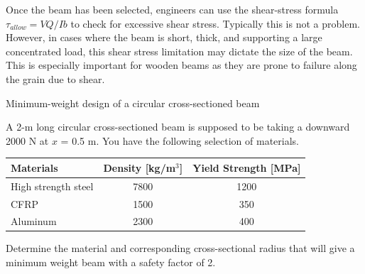 \documentclass[
10pt,
a4paper,
openany,
svgnames,
]{book}
\begin{document}
Once the beam has been selected, engineers can use the shear-stress formula $\tau_{allow} = VQ/Ib$ to check for excessive shear stress. Typically this is not a problem. However, in cases where the beam is short, thick, and supporting a large concentrated load, this shear stress limitation may dictate the size of the beam. This is especially important for wooden beams as they are prone to failure along the grain due to shear.

\begin{example} Minimum-weight design of a circular cross-sectioned beam

  A 2-m long circular cross-sectioned beam is supposed to be taking a downward 2000 N at $x$ = 0.5 m. You have the following selection of materials.

  \begin{table}[H]
    \centering
    \begin{tabular}{lcc}
      \toprule
      Materials & Density [kg/m$^3$] & Yield Strength [MPa] \\
      \midrule
      High strength steel & 7800 & 1200 \\
      CFRP  & 1500 & 350 \\
      Aluminum & 2300 & 400 \\
      \bottomrule
    \end{tabular}
  \end{table}

  Determine the material and corresponding cross-sectional radius that will give a minimum weight beam with a safety factor of 2.
  
\end{example}
\end{document}
